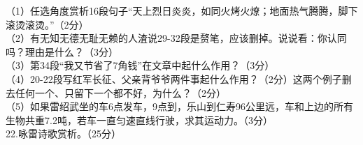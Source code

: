 \documentclass[UTF8,12pt,oneside]{ctexbook}
\begin{document}
    \songti
    （1）任选角度赏析16段句子“天上烈日炎炎，如同火烤火燎；地面热气腾腾，脚下滚烫滚烫。”（2分） 
    ~\\
    
    （2）有无知无德无耻无赖的人渣说29-32段是赘笔，应该删掉。说说看：你认同吗？理由是什么？（3分） 
    ~\\
    
    （3）第34段“我又节省了7角钱”在文章中起什么作用？（3分） 
    ~\\
    
    （4）20-22段写红军长征、父亲背爷爷两件事起什么作用？（2分）这两个例子删去任何一个、只留下一个都不好，为什么？（2分） 
    ~\\
    
    （5）如果雷绍武坐的车6点发车，9点到，乐山到仁寿96公里远，车和上边的所有生物共重7.2吨，若车一直匀速直线行驶，求其运动力。（3分）
    ~\\

    22.咏雷诗歌赏析。（25分）
    
\end{document}
